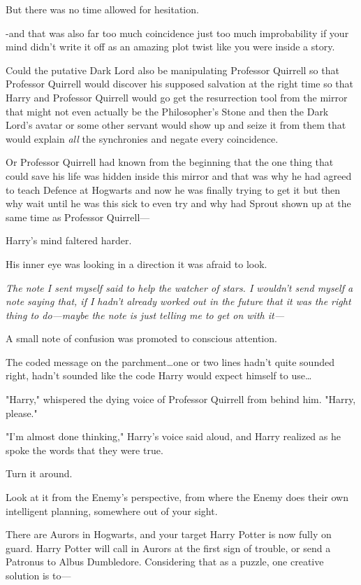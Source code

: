 But there was no time allowed for hesitation.

-and that was also far too much coincidence just too much improbability if your
mind didn't write it off as an amazing plot twist like you were inside a story.

Could the putative Dark Lord also be manipulating Professor Quirrell so that
Professor Quirrell would discover his supposed salvation at the right time so
that Harry and Professor Quirrell would go get the resurrection tool from the
mirror that might not even actually be the Philosopher's Stone and then the
Dark Lord's avatar or some other servant would show up and seize it from them
that would explain \emph{all} the synchronies and negate every coincidence.

Or Professor Quirrell had known from the beginning that the one thing that
could save his life was hidden inside this mirror and that was why he had
agreed to teach Defence at Hogwarts and now he was finally trying to get it but
then why wait until he was this sick to even try and why had Sprout shown up at
the same time as Professor Quirrell—

Harry's mind faltered harder.

His inner eye was looking in a direction it was afraid to look.

\emph{The note I sent myself said to help the watcher of stars. I wouldn't send
myself a note saying that, if I hadn't already worked out in the future that it
was the right thing to do—maybe the note is just telling me to get on with
it—}

A small note of confusion was promoted to conscious attention.

The coded message on the parchment…one or two lines hadn't quite
sounded right, hadn't sounded like the code Harry would expect himself to
use…

"Harry," whispered the dying voice of Professor Quirrell from behind him.
"Harry, please."

"I'm almost done thinking," Harry's voice said aloud, and Harry realized as he
spoke the words that they were true.

Turn it around.

Look at it from the Enemy's perspective, from where the Enemy does their own
intelligent planning, somewhere out of your sight.

There are Aurors in Hogwarts, and your target Harry Potter is now fully on
guard. Harry Potter will call in Aurors at the first sign of trouble, or send a
Patronus to Albus Dumbledore. Considering that as a puzzle, one creative
solution is to—

